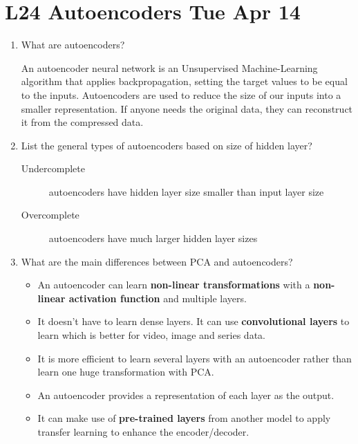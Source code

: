 \documentclass[12pt]{article}
\newenvironment{QandA}{\begin{enumerate}[label=\bfseries\arabic*.]\bfseries}
{\end{enumerate}}
\newenvironment{answered}{\par\normalfont\color{Sepia}}{}
\begin{document}
\section*{L24 Autoencoders \textemdash{} Tue Apr 14}
\begin{QandA}
    \item What are autoencoders?
    \begin{answered}
        An autoencoder neural network is an Unsupervised Machine-Learning 
        algorithm that applies backpropagation, setting the target values 
        to be equal to the inputs. Autoencoders are used to reduce the size
        of our inputs into a smaller representation.  If anyone needs the 
        original data, they can reconstruct it from the compressed data.
    \end{answered}

    \item List the general types of autoencoders based on size of hidden layer?
    \begin{answered}
        \begin{description}
            \item[Undercomplete] autoencoders have hidden layer size smaller than input layer size
            \item[Overcomplete] autoencoders have much larger hidden layer sizes
        \end{description}
    \end{answered}

    \item What are the main differences between PCA and autoencoders?
    \begin{answered}
        \begin{itemize}
            \item An autoencoder can learn \textbf{non-linear transformations} with a 
                  \textbf{non-linear activation function} and multiple layers.
            \item It doesn’t have to learn dense layers. It can use \textbf{convolutional
                  layers} to learn which is better for video, image and series data.
            \item It is more efficient to learn several layers with an autoencoder
                  rather than learn one huge transformation with PCA.
            \item An autoencoder provides a representation of each layer as the output.
            \item It can make use of \textbf{pre-trained layers} from another model to 
                  apply transfer learning to enhance the encoder/decoder.
        \end{itemize}
    \end{answered}


\end{QandA}
\end{document}
